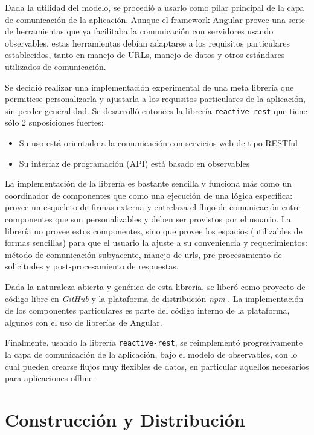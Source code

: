 Dada la utilidad del modelo, se procedió a usarlo como pilar principal de la capa de comunicación de la aplicación. Aunque el framework Angular provee una serie de herramientas que ya facilitaba la comunicación con servidores usando observables, estas herramientas debían adaptarse a los requisitos particulares establecidos, tanto en manejo de URLs, manejo de datos y otros estándares utilizados de comunicación.

Se decidió realizar una implementación experimental de una meta librería que permitiese personalizarla y ajustarla a los requisitos particulares de la aplicación, sin perder generalidad. Se desarrolló entonces la librería \texttt{reactive-rest} que tiene sólo 2 suposiciones fuertes:

\begin{itemize}
  \item Su uso está orientado a la comunicación con servicios web de tipo RESTful
  \item Su interfaz de programación (API) está basado en observables
\end{itemize}

La implementación de la librería es bastante sencilla y funciona más como un coordinador de componentes que como una ejecución de una lógica específica: provee un esqueleto de firmas externa y entrelaza el flujo de comunicación entre componentes que son personalizables y deben ser provistos por el usuario. La librería no provee estos componentes, sino que provee los espacios (utilizables de formas sencillas) para que el usuario la ajuste a su conveniencia y requerimientos: método de comunicación subyacente, manejo de urls, pre-procesamiento de solicitudes y post-procesamiento de respuestas.

Dada la naturaleza abierta y genérica de esta librería, se liberó como proyecto de código libre en \textit{GitHub} \cite{reactiverestgithub} y la plataforma de distribución \textit{npm} \cite{reactiverestnpm}. La implementación de los componentes particulares es parte del código interno de la plataforma, algunos con el uso de librerías de Angular.

Finalmente, usando la librería \texttt{reactive-rest}, se reimplementó progresivamente la capa de comunicación de la aplicación, bajo el modelo de observables, con lo cual pueden crearse flujos muy flexibles de datos, en particular aquellos necesarios para aplicaciones offline.

\section{Construcción y Distribución}


